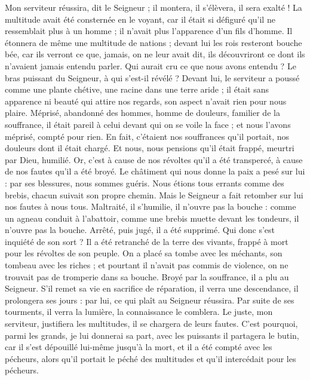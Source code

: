Mon serviteur réussira, dit le Seigneur ;
il montera, il s’élèvera, il sera exalté !
La multitude avait été consternée en le voyant,
car il était si défiguré
qu’il ne ressemblait plus à un homme ;
il n’avait plus l’apparence d’un fils d’homme.
Il étonnera de même une multitude de nations ;
devant lui les rois resteront bouche bée,
car ils verront ce que, jamais, on ne leur avait dit,
ils découvriront ce dont ils n’avaient jamais entendu parler.
\versseparator
Qui aurait cru ce que nous avons entendu ?
Le bras puissant du Seigneur, à qui s’est-il révélé ?
Devant lui, le serviteur a poussé comme une plante chétive,
une racine dans une terre aride ;
il était sans apparence ni beauté qui attire nos regards,
son aspect n’avait rien pour nous plaire.
Méprisé, abandonné des hommes,
homme de douleurs, familier de la souffrance,
il était pareil à celui devant qui on se voile la face ;
et nous l’avons méprisé, compté pour rien.
En fait, c’étaient nos souffrances qu’il portait,
nos douleurs dont il était chargé.
Et nous, nous pensions qu’il était frappé,
meurtri par Dieu, humilié.
Or, c’est à cause de nos révoltes qu’il a été transpercé,
à cause de nos fautes qu’il a été broyé.
Le châtiment qui nous donne la paix a pesé sur lui :
par ses blessures, nous sommes guéris.
Nous étions tous errants comme des brebis,
chacun suivait son propre chemin.
Mais le Seigneur a fait retomber sur lui
nos fautes à nous tous.
\versseparator
Maltraité, il s’humilie,
il n’ouvre pas la bouche :
comme un agneau conduit à l’abattoir,
comme une brebis muette devant les tondeurs,
il n’ouvre pas la bouche.
Arrêté, puis jugé, il a été supprimé.
Qui donc s’est inquiété de son sort ?
Il a été retranché de la terre des vivants,
frappé à mort pour les révoltes de son peuple.
On a placé sa tombe avec les méchants,
son tombeau avec les riches ;
et pourtant il n’avait pas commis de violence,
on ne trouvait pas de tromperie dans sa bouche.
Broyé par la souffrance, il a plu au Seigneur.
S’il remet sa vie en sacrifice de réparation,
il verra une descendance, il prolongera ses jours :
par lui, ce qui plaît au Seigneur réussira.
\versseparator
Par suite de ses tourments, il verra la lumière,
la connaissance le comblera.
Le juste, mon serviteur, justifiera les multitudes,
il se chargera de leurs fautes.
C’est pourquoi, parmi les grands, je lui donnerai sa part,
avec les puissants il partagera le butin,
car il s’est dépouillé lui-même
jusqu’à la mort,
et il a été compté avec les pécheurs,
alors qu’il portait le péché des multitudes
et qu’il intercédait pour les pécheurs.